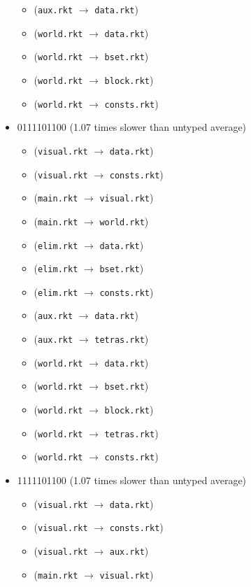 \documentclass{article}
\newcommand{\mono}[1]{\texttt{#1}}
\begin{document}
\begin{itemize}
\begin{itemize}
  \item (\mono{aux.rkt} $\rightarrow$ \mono{data.rkt})
  \item (\mono{world.rkt} $\rightarrow$ \mono{data.rkt})
  \item (\mono{world.rkt} $\rightarrow$ \mono{bset.rkt})
  \item (\mono{world.rkt} $\rightarrow$ \mono{block.rkt})
  \item (\mono{world.rkt} $\rightarrow$ \mono{consts.rkt})
  \end{itemize}
\item 0111101100 (1.07 times slower than untyped average)
  \begin{itemize}
  \item (\mono{visual.rkt} $\rightarrow$ \mono{data.rkt})
  \item (\mono{visual.rkt} $\rightarrow$ \mono{consts.rkt})
  \item (\mono{main.rkt} $\rightarrow$ \mono{visual.rkt})
  \item (\mono{main.rkt} $\rightarrow$ \mono{world.rkt})
  \item (\mono{elim.rkt} $\rightarrow$ \mono{data.rkt})
  \item (\mono{elim.rkt} $\rightarrow$ \mono{bset.rkt})
  \item (\mono{elim.rkt} $\rightarrow$ \mono{consts.rkt})
  \item (\mono{aux.rkt} $\rightarrow$ \mono{data.rkt})
  \item (\mono{aux.rkt} $\rightarrow$ \mono{tetras.rkt})
  \item (\mono{world.rkt} $\rightarrow$ \mono{data.rkt})
  \item (\mono{world.rkt} $\rightarrow$ \mono{bset.rkt})
  \item (\mono{world.rkt} $\rightarrow$ \mono{block.rkt})
  \item (\mono{world.rkt} $\rightarrow$ \mono{tetras.rkt})
  \item (\mono{world.rkt} $\rightarrow$ \mono{consts.rkt})
  \end{itemize}
\item 1111101100 (1.07 times slower than untyped average)
  \begin{itemize}
  \item (\mono{visual.rkt} $\rightarrow$ \mono{data.rkt})
  \item (\mono{visual.rkt} $\rightarrow$ \mono{consts.rkt})
  \item (\mono{visual.rkt} $\rightarrow$ \mono{aux.rkt})
  \item (\mono{main.rkt} $\rightarrow$ \mono{visual.rkt})

\end{itemize}
\end{itemize}
\end{document}

